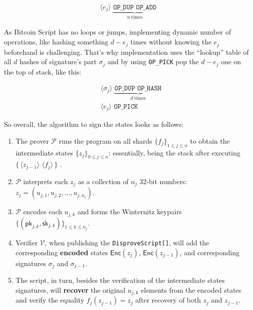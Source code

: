\documentclass{iacrtrans}
\newcommand{\elem}[1]{\, \langle #1 \rangle \,}
\newcommand{\opcode}[1]{\, \texttt{#1} \,}
\newcommand{\script}[1]{ $\big\{ #1 \big\}$ }
\begin{document}
\begin{empheqboxed}
  \begin{align*}
    \elem{e_j} \underbrace{\opcode{OP\_DUP} \opcode{OP\_ADD}}_{n \; \text{times}}
  \end{align*}
\end{empheqboxed}

As Bitcoin Script has no loops or jumps, implementing dynamic number
of operations, like hashing something $d - e_j$ times without knowing
the $e_j$ beforehand is challenging. That's why implementation uses
the ``lookup'' table of all $d$ hashes of signature's part $\sigma_j$ and
by using \texttt{OP\_PICK} pop the $d - e_j$ one on the top of stack,
like this:

\begin{empheqboxed}
  \begin{align*}
    & \elem{\sigma_j} \underbrace{\opcode{OP\_DUP}
    \opcode{OP\_HASH}}_{d \; \text{times}} \\
    & \elem{e_j} \opcode{OP\_PICK}
  \end{align*}
\end{empheqboxed}

So overall, the algorithm to sign the states looks as follows:
\begin{enumerate}
  \item The prover $\mathcal{P}$ runs the program on all shards $\{f_j\}_{1 \leq j \leq n}$ to obtain the intermediate states $\{z_j\}_{0 \leq j \leq n}$: essentially, being the stack after executing \script{\elem{z_{j-1}} \elem{f_j}}.
  \item $\mathcal{P}$ interprets each $z_j$ as a collection of $n_j$ 32-bit numbers: $z_j = (u_{j,1}, u_{j,2}, \dots, u_{j, n_j})$.
  \item $\mathcal{P}$ encodes each $u_{j,k}$ and forms the Winternitz keypairs $\{(\mathsf{pk}_{j,k},\mathsf{sk}_{j,k})\}_{1 \leq k \leq n_j}$.
  \item Verifier $\mathcal{V}$, when publishing the \texttt{DisproveScript[]}, will add the corresponding \textbf{encoded} states $\mathsf{Enc}(z_j)$, $\mathsf{Enc}(z_{j-1})$, and corresponding signatures $\sigma_j$ and $\sigma_{j-1}$. 
  \item The script, in turn, besides the verification of the intermediate states signatures, will \textbf{recover} the original $u_{j,k}$ elements from the encoded states and verify the equality $f_j(z_{j-1}) = z_j$ after recovery of both $z_j$ and $z_{j-1}$.
\end{enumerate}
\end{document}
